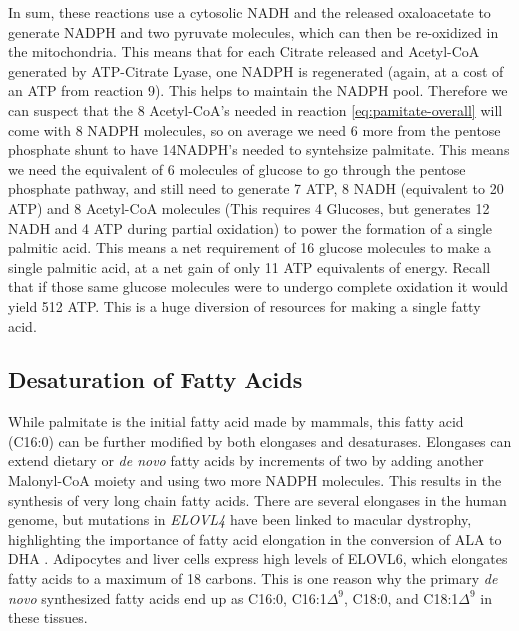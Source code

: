 \documentclass{tufte-handout}
\begin{document}
In sum, these reactions use a cytosolic NADH and the released oxaloacetate to generate NADPH and two pyruvate molecules, which can then be re-oxidized in the mitochondria.  This means that for each Citrate released and Acetyl-CoA generated by ATP-Citrate Lyase, one NADPH is regenerated (again, at a cost of an ATP from reaction 9). This helps to maintain the NADPH pool. Therefore we can suspect that the 8 Acetyl-CoA's needed in reaction \ref{eq:pamitate-overall} will come with 8 NADPH molecules, so on average we need 6 more from the pentose phosphate shunt to have 14NADPH's needed to syntehsize palmitate. This means we need the equivalent of 6 molecules of glucose to go through the pentose phosphate pathway, and still need to generate 7 ATP, 8 NADH (equivalent to 20 ATP) and 8 Acetyl-CoA molecules (This requires  4 Glucoses, but generates 12 NADH and 4 ATP during partial oxidation) to power the formation of a single palmitic acid.  This means a net requirement of 16 glucose molecules to make a single palmitic acid, at a net gain of only 11 ATP equivalents of energy.  Recall that if those same glucose molecules were to undergo complete oxidation it would yield 512 ATP.  This is a huge diversion of resources for making a single fatty acid.


\subsection{Desaturation of Fatty Acids}

While palmitate is the initial fatty acid made by mammals, this fatty acid (C16:0) can be further modified by both elongases and desaturases.  Elongases can extend dietary or \textit{de novo} fatty acids by increments of two by adding another Malonyl-CoA moiety and using two more NADPH molecules.  This results in the synthesis of very long chain fatty acids.  There are several elongases in the human genome, but mutations in \textit{ELOVL4} have been linked to macular dystrophy, highlighting the importance of fatty acid elongation in the conversion of ALA to DHA \citep{Zhang2001}.  Adipocytes and liver cells express high levels of ELOVL6, which elongates fatty acids to a maximum of 18 carbons.  This is one reason why the primary \textit{de novo} synthesized fatty acids end up as C16:0, C16:1$\Delta^9$, C18:0, and C18:1$\Delta^9$ in these tissues.
\end{document}
